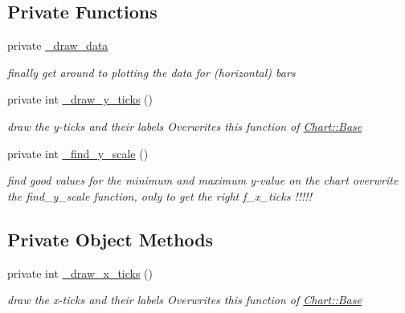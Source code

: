 \subsection*{Private Functions}
\label{_amgrp8d29cff216bafa3117e21883ea7c6b5f}
 \begin{DoxyCompactItemize}
\item 
\hypertarget{classChart_1_1HorizontalBars_ab15c9c83c6c3b7848d801f293cb887f0}{
private \hyperlink{classChart_1_1HorizontalBars_ab15c9c83c6c3b7848d801f293cb887f0}{\_\-draw\_\-data}}
\label{classChart_1_1HorizontalBars_ab15c9c83c6c3b7848d801f293cb887f0}

\begin{DoxyCompactList}\small\item\em finally get around to plotting the data for (horizontal) bars \item\end{DoxyCompactList}\item 
private int \hyperlink{classChart_1_1HorizontalBars_afb085d5cca48ae94538f345945212a82}{\_\-draw\_\-y\_\-ticks} ()
\begin{DoxyCompactList}\small\item\em draw the y-\/ticks and their labels Overwrites this function of \hyperlink{classChart_1_1Base}{Chart::Base} \item\end{DoxyCompactList}\item 
private int \hyperlink{classChart_1_1HorizontalBars_acec45b0698c777d244fb6f6dd1202e20}{\_\-find\_\-y\_\-scale} ()
\begin{DoxyCompactList}\small\item\em find good values for the minimum and maximum y-\/value on the chart overwrite the find\_\-y\_\-scale function, only to get the right f\_\-x\_\-ticks !!!!! \item\end{DoxyCompactList}\end{DoxyCompactItemize}
\subsection*{Private Object Methods}
\label{_amgrp57eb0ba2c0003ce1a95a820bfa03b4b4}
 \begin{DoxyCompactItemize}
\item 
private int \hyperlink{classChart_1_1HorizontalBars_aabe5236ec45ce98269d60ea17944e283}{\_\-draw\_\-x\_\-ticks} ()
\begin{DoxyCompactList}\small\item\em draw the x-\/ticks and their labels Overwrites this function of \hyperlink{classChart_1_1Base}{Chart::Base} \item\end{DoxyCompactList}\end{DoxyCompactItemize}


